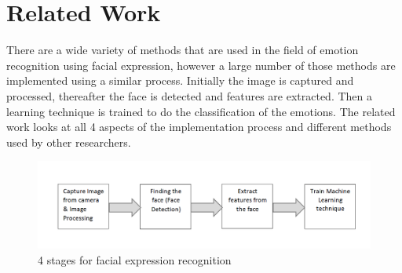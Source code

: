 \chapter{Related Work}

There are a wide variety of methods that are used in the field of emotion recognition using facial expression, however a large number of those methods are implemented using a similar process. Initially the image is captured and processed, thereafter the face is detected and features are extracted. Then a learning technique is trained to do the classification of the emotions. The related work looks at all 4 aspects of the implementation process and different methods used by other researchers.

\begin{figure}[ht]
  \centering
  \includegraphics[scale=0.6]{4}
  \caption{4 stages for facial expression recognition}
\end{figure}
